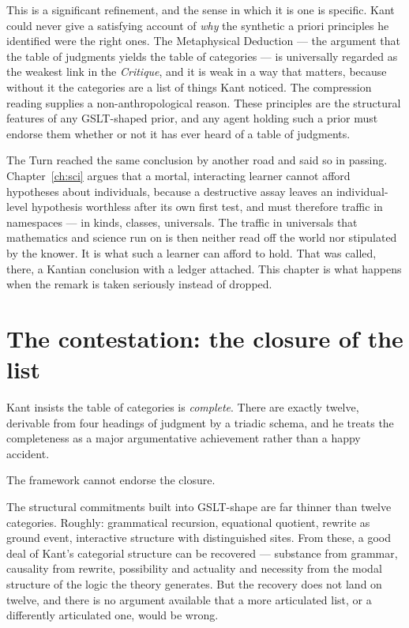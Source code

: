 This is a significant refinement, and the sense in which it is one
is specific.
Kant could never give a satisfying account of \emph{why} the
synthetic a priori principles he identified were the right ones.
The Metaphysical Deduction --- the argument that the table of
judgments yields the table of categories --- is universally
regarded as the weakest link in the \emph{Critique}, and it is
weak in a way that matters, because without it the categories are
a list of things Kant noticed.
The compression reading supplies a non-anthropological reason.
These principles are the structural features of any GSLT-shaped
prior, and any agent holding such a prior must endorse them
whether or not it has ever heard of a table of judgments.

The Turn reached the same conclusion by another road and said so in
passing.
Chapter~\ref{ch:sci} argues that a mortal, interacting learner
cannot afford hypotheses about individuals, because a destructive
assay leaves an individual-level hypothesis worthless after its own
first test, and must therefore traffic in namespaces --- in kinds,
classes, universals.
The traffic in universals that mathematics and science run on is
then neither read off the world nor stipulated by the knower.
It is what such a learner can afford to hold.
That was called, there, a Kantian conclusion with a ledger
attached.
This chapter is what happens when the remark is taken seriously
instead of dropped.

\section{The contestation: the closure of the list}
\label{sec:kant-closure}

Kant insists the table of categories is \emph{complete}.
There are exactly twelve, derivable from four headings of judgment
by a triadic schema, and he treats the completeness as a major
argumentative achievement rather than a happy accident.

The framework cannot endorse the closure.

The structural commitments built into GSLT-shape are far thinner
than twelve categories.
Roughly: grammatical recursion, equational quotient, rewrite as
ground event, interactive structure with distinguished sites.
From these, a good deal of Kant's categorial structure can be
recovered --- substance from grammar, causality from rewrite,
possibility and actuality and necessity from the modal structure of
the logic the theory generates.
But the recovery does not land on twelve, and there is no argument
available that a more articulated list, or a differently
articulated one, would be wrong.

